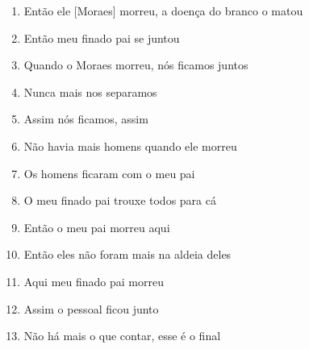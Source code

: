 \begin{enumerate}
 \item Então ele {[}Moraes{]} morreu, a doença do branco o matou
 \item Então meu finado pai se juntou
 \item Quando o Moraes morreu, nós ficamos juntos
 \item Nunca mais nos separamos
 \item Assim nós ficamos, assim
 \item Não havia mais homens quando ele morreu
 \item Os homens ficaram com o meu pai
 \item O meu finado pai trouxe todos para cá
 \item Então o meu pai morreu aqui
 \item Então eles não foram mais na aldeia deles
 \item Aqui meu finado pai morreu
 \item Assim o pessoal ficou junto
 \item Não há mais o que contar, esse é o final
\end{enumerate}
